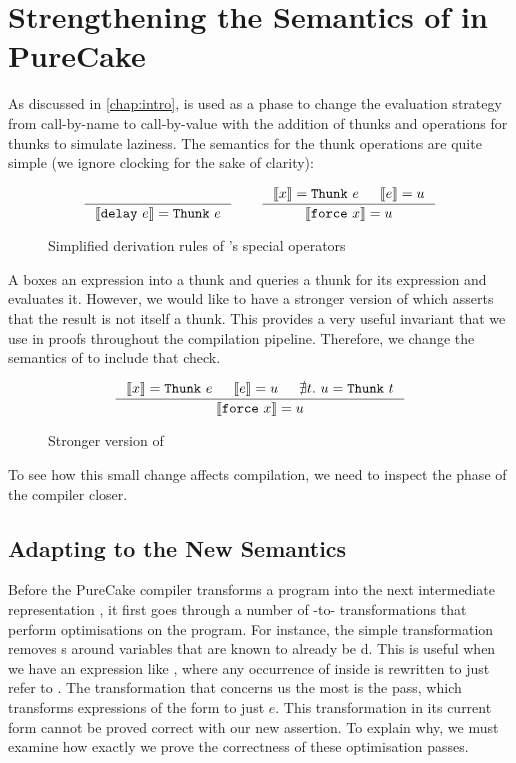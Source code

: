 \chapter{Strengthening the Semantics of  in PureCake}
\label{chap:pure}

As discussed in \autoref{chap:intro}, \ThunkLang{} is used as a phase to change
the evaluation strategy from call-by-name to call-by-value with the addition of
thunks and operations for thunks to simulate laziness. The semantics for the
thunk operations are quite simple (we ignore clocking for the sake of clarity):

\begin{figure}[h]
  \[
    \inference{}{|[\lit{delay}\ e|] = \lit{Thunk}\ e} \qquad
    \inference
    {|[x|] = \lit{Thunk}\ e& |[e|] = u}
    {|[\lit{force}\ x|] = u}
  \]
  \caption{Simplified derivation rules of \ThunkLang{}'s special operators}
\end{figure}

A  boxes an expression into a thunk and  queries
a thunk for its expression and evaluates it. However, we would like to have a
stronger version of  which asserts that the result is not itself a
thunk. This provides a very useful invariant that we use in proofs throughout
the compilation pipeline. Therefore, we change the semantics of  to
include that check.

\begin{figure}[h]
  \[
    \inference
    {|[x|] = \lit{Thunk}\ e& |[e|] = u& \nexists t.\ u = \lit{Thunk}\ t}
    {|[\lit{force}\ x|] = u}
  \]
  \caption{Stronger version of }
\end{figure}

To see how this small change affects compilation, we need to inspect the
\ThunkLang{} phase of the compiler closer.

\section{Adapting \ThunkLang{} to the New Semantics}

Before the PureCake compiler transforms a \ThunkLang{} program into the next
intermediate representation \EnvLang{}, it first goes through a number of
\ThunkLang{}-to-\ThunkLang{} transformations that perform optimisations on the
program. For instance, the simple transformation  removes
s around variables that are known to already be d. This is
useful when we have an expression like , where any
occurrence of  inside is rewritten to just refer to . The
transformation that concerns us the most is the  pass, which
transforms expressions of the form  to just $e$. This
transformation in its current form cannot be proved correct with our new
assertion. To explain why, we must examine how exactly we prove the correctness
of these optimisation passes.

